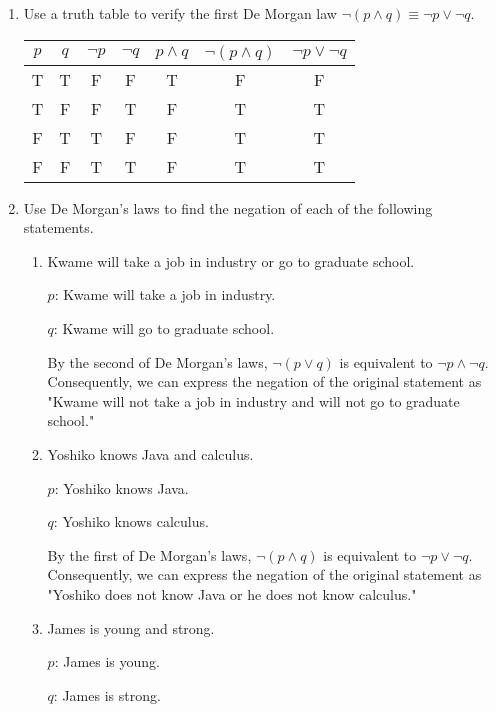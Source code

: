 \documentclass[11pt]{article}
\begin{document}
\begin{enumerate}[label=\textbf{\arabic*.}]
	\item Use a truth table to verify the first De Morgan law $\neg(p \land q) \equiv \neg p \lor \neg q$.
	
	\begin{tabular}{c | c | c | c | c | c | c}
		$p$ & $q$ & $\neg p$ & $\neg q$ & $p \land q$ & $\neg(p \land q)$ & $\neg p \lor \neg q$ \\
		\hline
		T & T & F & F & T & F & F \\
		T & F & F & T & F & T & T \\
		F & T & T & F & F & T & T \\
		F & F & T & T & F & T & T 
	\end{tabular}

	\item Use De Morgan's laws to find the negation of each of the following statements.
	\begin{enumerate}[label=\textbf{\alph*)}]
		\item Kwame will take a job in industry or go to graduate school.
		
		\hspace{1em}$p$: Kwame will take a job in industry.
		
		\hspace{1em}$q$: Kwame will go to graduate school.
		
		By the second of De Morgan's laws, $\neg(p \lor q)$ is equivalent to $\neg p \land \neg q$. Consequently, we can express the negation of the original statement as "Kwame will not take a job in industry and will not go to graduate school."
		
		\item Yoshiko knows Java and calculus.
		
		\hspace{1em}$p$: Yoshiko knows Java.
		
		\hspace{1em}$q$: Yoshiko knows calculus.
		
		By the first of De Morgan's laws, $\neg(p \land q)$ is equivalent to $\neg p \lor \neg q$. Consequently, we can express the negation of the original statement as "Yoshiko does not know Java or he does not know calculus."
		
		\item James is young and strong.
		
		\hspace{1em}$p$: James is young.
		
		\hspace{1em}$q$: James is strong.
		

\end{enumerate}
\end{enumerate}
\end{document}
